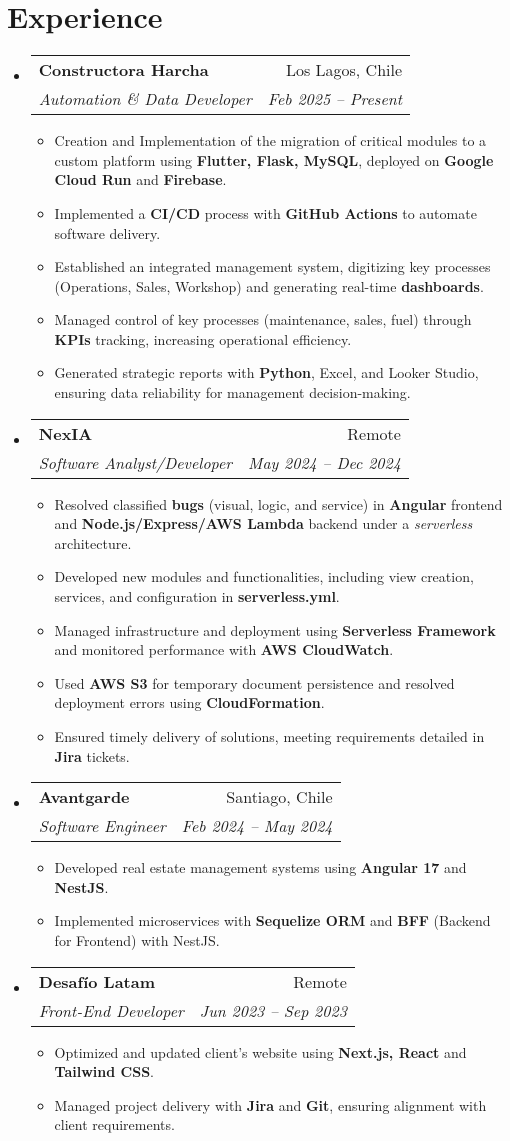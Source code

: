 \documentclass[letterpaper,11pt]{article}
\makeatletter
\newcommand{\resumeItem}[2]{
	\item\small{\textbf{#1} #2}
}
\newcommand{\resumeSubheading}[4]{
	\item
		\begin{tabular*}{\textwidth}{@{\extracolsep{\fill}}p{0.6\textwidth}r}
				\textbf{#1} & #2 \\
				\textit{\small #3} & \textit{\small #4} \\
		\end{tabular*}
}
\newcommand{\resumeSubHeadingListStart}{\begin{itemize}[leftmargin=0.2cm,label={}]}
\newcommand{\resumeSubHeadingListEnd}{\end{itemize}}
\newcommand{\resumeItemListStart}{\begin{itemize}[leftmargin=0.4cm]}
\newcommand{\resumeItemListEnd}{\end{itemize}}
\makeatother
\begin{document}
\section{Experience}
    \resumeSubHeadingListStart
    \resumeSubheading
      {Constructora Harcha}{Los Lagos, Chile}
      {Automation \& Data Developer}{Feb 2025 -- Present}
      \resumeItemListStart
        \resumeItem{}{Creation and Implementation of the migration of critical modules to a custom platform using \textbf{Flutter, Flask, MySQL}, deployed on \textbf{Google Cloud Run} and \textbf{Firebase}.}
        \resumeItem{}{Implemented a \textbf{CI/CD} process with \textbf{GitHub Actions} to automate software delivery.}
        \resumeItem{}{Established an integrated management system, digitizing key processes (Operations, Sales, Workshop) and generating real-time \textbf{dashboards}.}
        \resumeItem{}{Managed control of key processes (maintenance, sales, fuel) through \textbf{KPIs} tracking, increasing operational efficiency.}
        \resumeItem{}{Generated strategic reports with \textbf{Python}, Excel, and Looker Studio, ensuring data reliability for management decision-making.}
      \resumeItemListEnd
    \resumeSubheading
      {NexIA}{Remote}
      {Software Analyst/Developer}{May 2024 -- Dec 2024}
      \resumeItemListStart
        \resumeItem{}{Resolved classified \textbf{bugs} (visual, logic, and service) in \textbf{Angular} frontend and \textbf{Node.js/Express/AWS Lambda} backend under a \textit{serverless} architecture.}
        \resumeItem{}{Developed new modules and functionalities, including view creation, services, and configuration in \textbf{serverless.yml}.}
        \resumeItem{}{Managed infrastructure and deployment using \textbf{Serverless Framework} and monitored performance with \textbf{AWS CloudWatch}.}
        \resumeItem{}{Used \textbf{AWS S3} for temporary document persistence and resolved deployment errors using \textbf{CloudFormation}.}
        \resumeItem{}{Ensured timely delivery of solutions, meeting requirements detailed in \textbf{Jira} tickets.}
      \resumeItemListEnd
    \resumeSubheading
      {Avantgarde}{Santiago, Chile}
      {Software Engineer}{Feb 2024 -- May 2024}
      \resumeItemListStart
        \resumeItem{}{Developed real estate management systems using \textbf{Angular 17} and \textbf{NestJS}.}
        \resumeItem{}{Implemented microservices with \textbf{Sequelize ORM} and \textbf{BFF} (Backend for Frontend) with NestJS.}
      \resumeItemListEnd
    \resumeSubheading
      {Desafío Latam}{Remote}
      {Front-End Developer}{Jun 2023 -- Sep 2023}
      \resumeItemListStart
        \resumeItem{}{Optimized and updated client's website using \textbf{Next.js, React} and \textbf{Tailwind CSS}.}
        \resumeItem{}{Managed project delivery with \textbf{Jira} and \textbf{Git}, ensuring alignment with client requirements.}
      \resumeItemListEnd
    \resumeSubHeadingListEnd
\end{document}
